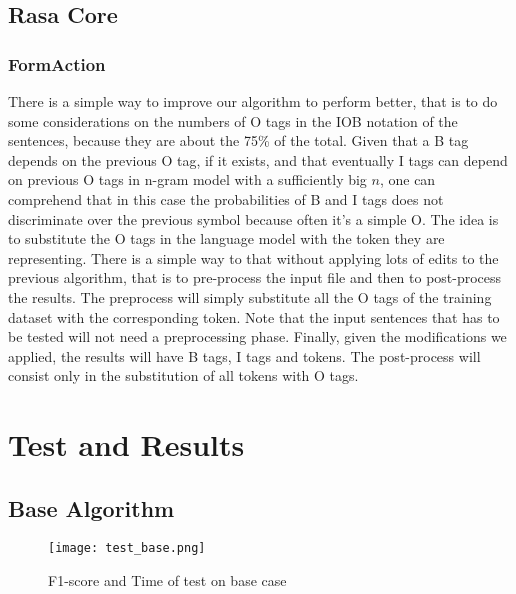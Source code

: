 \documentclass[11pt,a4paper]{article}
\begin{document}
\cite{pipeline}

\subsection{Rasa Core}




\subsubsection{FormAction}

There is a simple way to improve our algorithm to perform better, that is to do some considerations on the numbers of O tags in the IOB notation of the sentences, because they are about the 75\% of the total. Given that a B tag depends on the previous O tag, if it exists, and that eventually I tags can depend on previous O tags in n-gram model with a sufficiently big $n$, one can comprehend that in this case the probabilities of B and I tags does not discriminate over the previous symbol because often it's a simple O. The idea is to substitute the O tags in the language model with the token they are representing. There is a simple way to that without applying lots of edits to the previous algorithm, that is to pre-process the input file and then to post-process the results. The preprocess will simply substitute all the O tags of the training dataset with the corresponding token. Note that the input sentences that has to be tested will not need a preprocessing phase. Finally, given the modifications we applied, the results will have B tags, I tags and tokens. The post-process will consist only in the substitution of all tokens with O tags.

\section{Test and Results}

\subsection{Base Algorithm}

\begin{figure*}
  \texttt{[image: test\_base.png]}
  \caption{F1-score and Time of test on base case}
\end{figure*}
\end{document}
